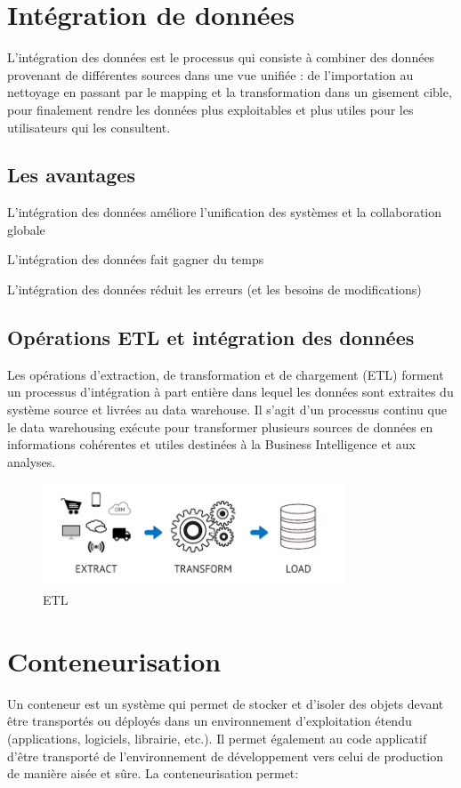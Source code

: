 \section{Intégration de données}
L’intégration des données est le processus qui consiste à combiner des données provenant de différentes
sources dans une vue unifiée : de l’importation au nettoyage en passant par le mapping et la transformation dans un gisement cible, pour finalement rendre les données plus exploitables et plus utiles pour les
utilisateurs qui les consultent.
\subsection{Les avantages}
\begin{list}{•}
	\item L’intégration des données améliore l’unification des systèmes et la collaboration globale
	\item L’intégration des données fait gagner du temps
	\item L’intégration des données réduit les erreurs (et les besoins de modifications)
\end{list}
\subsection{Opérations ETL et intégration des données}
Les opérations d’extraction, de transformation et de chargement (ETL) forment un processus d’intégration
à part entière dans lequel les données sont extraites du système source et livrées au data warehouse. Il s’agit
d’un processus continu que le data warehousing exécute pour transformer plusieurs sources de données en
informations cohérentes et utiles destinées à la Business Intelligence et aux analyses.
 \begin{figure}[!th]
            \centering
                \includegraphics[width=0.8\textwidth]{Figures/etl}
	       \decoRule
		\caption[ETL]{ETL}
	\label{fig:ETL}
	\end{figure}
\section{Conteneurisation}
Un conteneur est un système qui permet de stocker et d’isoler des objets devant être transportés ou déployés dans un environnement d’exploitation étendu (applications, logiciels, librairie, etc.). Il permet également au code applicatif d’être transporté de l’environnement de développement vers celui de production de manière aisée et sûre.  
La conteneurisation permet:

